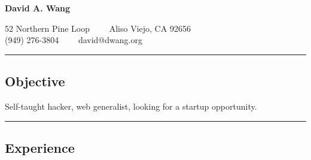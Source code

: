 \documentclass[10pt,letterpaper]{article}
\newenvironment{indentsection}[1]%
{\begin{list}{}%
  {\setlength{\leftmargin}{#1}}%
  \item[]%
}
{\end{list}}
\begin{document}
\begin{center}
{\LARGE \textbf{David A. Wang}}

52 Northern Pine Loop\ \ \textbullet
\ \ Aliso Viejo, CA 92656
\\
(949) 276-3804\ \ \textbullet
\ \ david@dwang.org
\end{center}


\hrule
\vspace{-0.4em}
\subsection*{Objective}
\begin{indentsection}{\parindent}
\begin{description*}
  \item Self-taught hacker, web generalist, looking for a startup opportunity.
\end{description*}
\end{indentsection}

\hrule
\vspace{-0.4em}
\subsection*{Experience}
\end{document}
